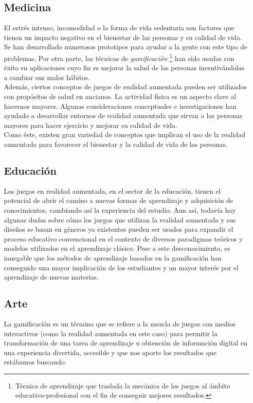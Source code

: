 \subsection{Medicina}
El estrés intenso, incomodidad o la forma de vida sedentaria son factores que tienen un impacto negativo en el bienestar de las personas y su calidad de vida. Se han desarrollado numerosos prototipos para ayudar a la gente con este tipo de problemas. Por otra parte, las técnicas de \textit{gamificación} \footnote{ Técnica de aprendizaje que traslada la mecánica de los juegos al ámbito educativo-profesional con el fin de conseguir mejores resultados.} han sido usadas con éxito en aplicaciones cuyo fin es mejorar la salud de las personas incentivándolas a cambiar sus malos hábitos.\\
Además, ciertos conceptos de juegos de realidad aumentada pueden ser utilizados con propósitos de salud en ancianos. La actividad física es un aspecto clave al hacernos mayores. Algunas consideraciones conceptuales e investigaciones han ayudado a desarrollar entornos de realidad aumentada que sirvan a las personas mayores para hacer ejercicio y mejorar su calidad de vida.\\
Como éste, existen gran variedad de conceptos que implican el uso de la realidad aumentada para favorecer el bienestar y la calidad de vida de las personas\cite{ARGames_Gamification}.
\subsection{Educación}
Los juegos en realidad aumentada, en el sector de la educación, tienen el potencial de abrir el camino a nuevas formas de aprendizaje y adquisición de conocimientos, cambiando así la experiencia del estudio. Aun así, todavía hay algunas dudas sobre cómo los juegos que utilizan la realidad aumentada y sus diseños se basan en géneros ya existentes pueden ser usados para expandir el proceso educativo convencional en el contexto de diversos paradigmas teóricos y modelos utilizados en el aprendizaje clásico. Pese a este desconocimiento, es innegable que los métodos de aprendizaje basados en la gamificación han conseguido una mayor implicación de los estudiantes y un mayor interés por el aprendizaje de nuevas materias\cite{ARGames_Gamification}.\\

\subsection{Arte}
La gamificación es un término que se refiere a la mezcla de juegos con medios interactivos (como la realidad aumentada en este caso) para permitir la transformación de una tarea de aprendizaje u obtención de información digital en una experiencia divertida, accesible y que nos aporte los resultados que estábamos buscando.\\

